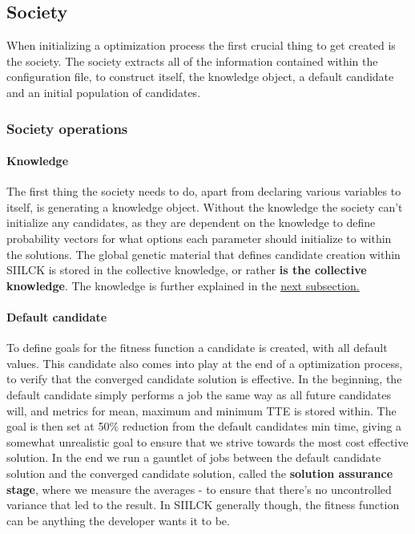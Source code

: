\documentclass[a4paper,english]{report}
\begin{document}
		\subsection{Society}
		\label{sec:society}
		When initializing a optimization process the first crucial thing to get created is the society. The society extracts all of the information contained within the configuration file, to construct itself, the knowledge object, a default candidate and an initial population of candidates.
		\subsubsection{Society operations}
		\paragraph{Knowledge}
		The first thing the society needs to do, apart from declaring various variables to itself, is generating a knowledge object. Without the knowledge the society can't initialize any candidates, as they are dependent on the knowledge to define probability vectors for what options each parameter should initialize to within the solutions. The global genetic material that defines candidate creation within SIILCK is stored in the collective knowledge, or rather \textbf{is the collective knowledge}. The knowledge is further explained in the \hyperref[knowledge]{next subsection.} 
		\paragraph{Default candidate}
		To define goals for the fitness function a candidate is created, with all default values. This candidate also comes into play at the end of a optimization process, to verify that the converged candidate solution is effective. In the beginning, the default candidate simply performs a job the same way as all future candidates will, and metrics for mean, maximum and minimum TTE is stored within. The goal is then set at 50\% reduction from the default candidates min time, giving a somewhat unrealistic goal to ensure that we strive towards the most cost effective solution. In the end we run a gauntlet of jobs between the default candidate solution and the converged candidate solution, called the \textbf{solution assurance stage}, where we measure the averages - to ensure that there's no uncontrolled variance that led to the result. In SIILCK generally though, the fitness function can be anything the developer wants it to be.
		\pagebreak
\end{document}
